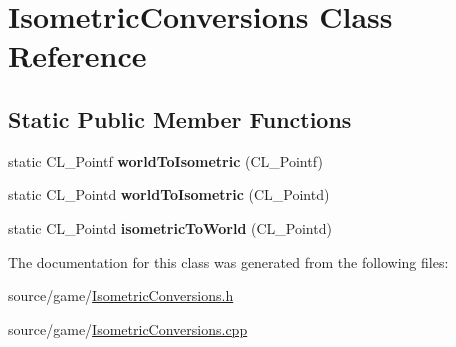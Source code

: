 \hypertarget{classIsometricConversions}{
\section{IsometricConversions Class Reference}
\label{classIsometricConversions}
}
\subsection*{Static Public Member Functions}
\begin{DoxyCompactItemize}
\item 
\hypertarget{classIsometricConversions_a925fb6ecff83501f956092ebd4c237ce}{
static CL\_\-Pointf {\bfseries worldToIsometric} (CL\_\-Pointf)}
\label{classIsometricConversions_a925fb6ecff83501f956092ebd4c237ce}

\item 
\hypertarget{classIsometricConversions_a039c5054ad98fa76218151f39941a3d8}{
static CL\_\-Pointd {\bfseries worldToIsometric} (CL\_\-Pointd)}
\label{classIsometricConversions_a039c5054ad98fa76218151f39941a3d8}

\item 
\hypertarget{classIsometricConversions_a97f4247e5ab8e730432bda5da0be3527}{
static CL\_\-Pointd {\bfseries isometricToWorld} (CL\_\-Pointd)}
\label{classIsometricConversions_a97f4247e5ab8e730432bda5da0be3527}

\end{DoxyCompactItemize}


The documentation for this class was generated from the following files:\begin{DoxyCompactItemize}
\item 
source/game/\hyperlink{IsometricConversions_8h}{IsometricConversions.h}\item 
source/game/\hyperlink{IsometricConversions_8cpp}{IsometricConversions.cpp}\end{DoxyCompactItemize}
